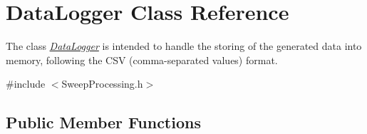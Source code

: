 \hypertarget{classDataLogger}{}\section{Data\+Logger Class Reference}
\label{classDataLogger}


The class {\itshape \hyperlink{classDataLogger}{Data\+Logger}} is intended to handle the storing of the generated data into memory, following the C\+SV (comma-\/separated values) format.  




{\ttfamily \#include $<$Sweep\+Processing.\+h$>$}

\subsection*{Public Member Functions}
